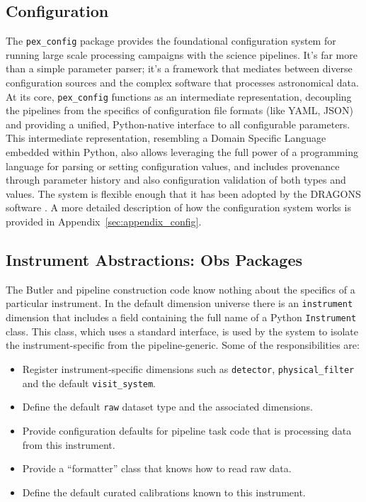 \subsection{Configuration}
The \texttt{pex\_config} package provides the foundational configuration system for running large scale processing campaigns with the science pipelines.
It's far more than a simple parameter parser; it's a framework that mediates between diverse configuration sources and the complex software that processes astronomical data.
At its core, \texttt{pex\_config} functions as an intermediate representation, decoupling the pipelines from the specifics of configuration file formats (like YAML, JSON) and providing a unified, Python-native interface to all configurable parameters.
This intermediate representation, resembling a Domain Specific Language embedded within Python, also allows leveraging the full power of a programming language for parsing or setting configuration values, and includes provenance through parameter history and also configuration validation of both types and values.
The system is flexible enough that it has been adopted by the DRAGONS software \citep{2023RNAAS...7..214L}.
A more detailed description of how the configuration system works is provided in Appendix~\ref{sec:appendix_config}.

\subsection{Instrument Abstractions: Obs Packages}
\label{sec:obs_packages}

The Butler and pipeline construction code know nothing about the specifics of a particular instrument.
In the default dimension universe there is an \texttt{instrument} dimension that includes a field containing the full name of a Python \texttt{Instrument} class.
This class, which uses a standard interface, is used by the system to isolate the instrument-specific from the pipeline-generic.
Some of the responsibilities are:

\begin{itemize}
\item Register instrument-specific dimensions such as \texttt{detector}, \texttt{physical\_filter} and the default \texttt{visit\_system}.
\item Define the default \texttt{raw} dataset type and the associated dimensions.
\item Provide configuration defaults for pipeline task code that is processing data from this instrument.
\item Provide a ``formatter'' class that knows how to read raw data.
\item Define the default curated calibrations known to this instrument.
\end{itemize}

